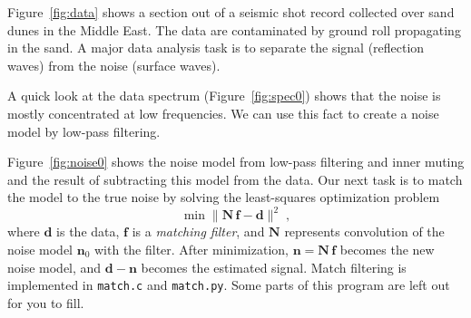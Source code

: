 
Figure~\ref{fig:data} shows a section out of a seismic shot record
collected over sand dunes in the Middle East. The data are
contaminated by ground roll propagating in the sand. A major data
analysis task is to separate the signal (reflection waves) from the
noise (surface waves).


A quick look at the data spectrum (Figure~\ref{fig:spec0}) shows that the
noise is mostly concentrated at low frequencies. We can use this fact
to create a noise model by low-pass filtering.


Figure~\ref{fig:noise0} shows the noise model from low-pass filtering
and inner muting and the result of subtracting this model from the
data. Our next task is to match the model to the true noise by solving
the least-squares optimization problem
\begin{equation}
\label{eq:ls}
\min \|\mathbf{N}\,\mathbf{f} - \mathbf{d}\|^2\;,
\end{equation}
where $\mathbf{d}$ is the data, $\mathbf{f}$ is a \emph{matching filter}, and
$\mathbf{N}$ represents convolution of the noise model
$\mathbf{n}_0$ with the filter. After minimization, $\mathbf{n} =
\mathbf{N}\,\mathbf{f}$ becomes the new noise model, and
$\mathbf{d}-\mathbf{n}$ becomes the estimated signal. Match filtering
is implemented in \texttt{match.c} and \texttt{match.py}. Some parts of this program
are left out for you to fill.

\lstset{language=c,numbers=left,numberstyle=\tiny,showstringspaces=false}


\lstset{language=python,numbers=left,numberstyle=\tiny,showstringspaces=false}


